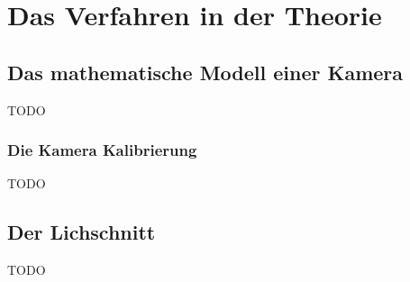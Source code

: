 \chapter{Das Verfahren in der Theorie}

\section{Das mathematische Modell einer Kamera}
TODO

\subsection{Die Kamera Kalibrierung}
\label{subsec:KameraKalibrierungTheorie}
TODO

\section{Der Lichschnitt}
TODO